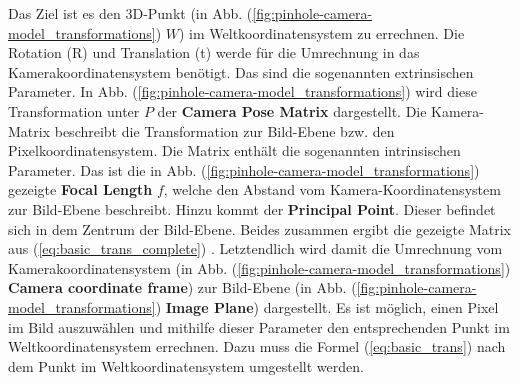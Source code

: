 	Das Ziel ist es den 3D-Punkt (in Abb. (\ref{fig:pinhole-camera-model_transformations}) \( W \)) im Weltkoordinatensystem zu errechnen. Die Rotation (R) und Translation (t) werde für die Umrechnung in das Kamerakoordinatensystem benötigt. Das sind die sogenannten extrinsischen Parameter. In Abb. (\ref{fig:pinhole-camera-model_transformations}) wird diese Transformation unter \( P \) der \textbf{Camera Pose Matrix} dargestellt. \newline
	Die Kamera-Matrix beschreibt die Transformation zur Bild-Ebene bzw. den Pixelkoordinatensystem. Die Matrix enthält die sogenannten intrinsischen Parameter. Das ist die in Abb. (\ref{fig:pinhole-camera-model_transformations}) gezeigte \textbf{Focal Length} \( f \), welche den Abstand vom Kamera-Koordinatensystem zur Bild-Ebene beschreibt. Hinzu kommt der \textbf{Principal Point}. Dieser befindet sich in dem Zentrum der Bild-Ebene. Beides zusammen ergibt die gezeigte Matrix aus (\ref{eq:basic_trans_complete}) \citep[Vgl.][]{noauthor_opencv_nodate-1}. Letztendlich wird damit die Umrechnung vom Kamerakoordinatensystem (in Abb. (\ref{fig:pinhole-camera-model_transformations}) \textbf{Camera coordinate frame}) zur Bild-Ebene (in Abb. (\ref{fig:pinhole-camera-model_transformations}) \textbf{Image Plane}) dargestellt. \newline 
	Es ist möglich, einen Pixel im Bild auszuwählen und mithilfe dieser Parameter den entsprechenden Punkt im Weltkoordinatensystem errechnen. Dazu muss die Formel (\ref{eq:basic_trans}) nach dem Punkt im Weltkoordinatensystem umgestellt werden.
	
